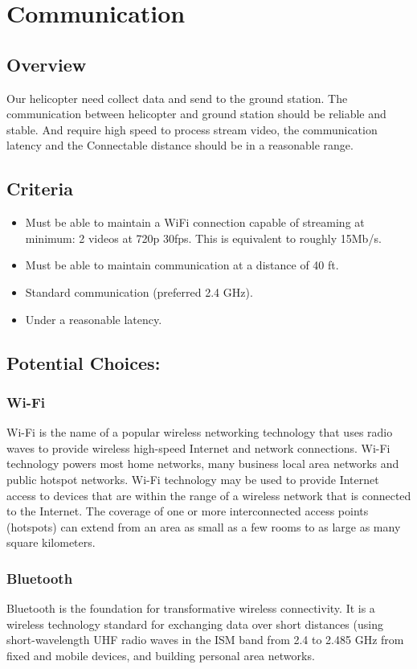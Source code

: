 \documentclass[letterpaper, 10, draftclsnofoot, onecolumn,compsoc]{IEEEtran}
\begin{document}
\vspace{2mm}
\section{Communication}
\subsection{Overview}
Our helicopter need collect data and send to the ground station. The communication between helicopter and ground station should be reliable and stable. And require high speed to process stream video, the communication latency and the Connectable distance should be in a reasonable range.

\subsection{Criteria}
\begin{itemize} 
\item 	Must be able to maintain a WiFi connection capable of streaming at minimum: 2 videos at 720p 30fps. This is equivalent to roughly 15Mb/s.
\item 	Must be able to maintain communication at a distance of 40 ft.
\item 	Standard communication (preferred 2.4 GHz).
\item  Under a reasonable latency.
\end{itemize}

\subsection{Potential Choices:}
\subsubsection{Wi-Fi}
Wi-Fi is the name of a popular wireless networking technology that uses radio waves to provide wireless high-speed Internet and network connections. Wi-Fi technology powers most home networks, many business local area networks and public hotspot networks. Wi-Fi technology may be used to provide Internet access to devices that are within the range of a wireless network that is connected to the Internet. The coverage of one or more interconnected access points (hotspots) can extend from an area as small as a few rooms to as large as many square kilometers. \cite{r3}

\subsubsection{Bluetooth}
Bluetooth is the foundation for transformative wireless connectivity. It is a wireless technology standard for exchanging data over short distances (using short-wavelength UHF radio waves in the ISM band from 2.4 to 2.485 GHz from fixed and mobile devices, and building personal area networks.\cite{r7}
\end{document}
